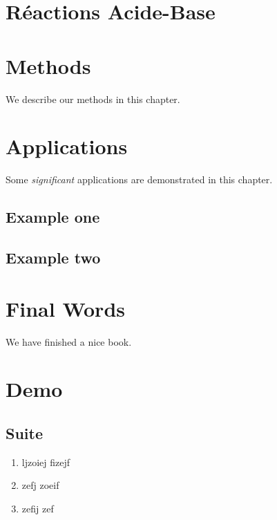 \documentclass[
]{book}
\providecommand{\tightlist}{%
  \setlength{\itemsep}{0pt}\setlength{\parskip}{0pt}}
\def\tightlist{}
\begin{document}
\hypertarget{ruxe9actions-acide-base}{%
\chapter{Réactions Acide-Base}\label{ruxe9actions-acide-base}}

\hypertarget{methods}{%
\chapter{Methods}\label{methods}}

We describe our methods in this chapter.

\hypertarget{applications}{%
\chapter{Applications}\label{applications}}

Some \emph{significant} applications are demonstrated in this chapter.

\hypertarget{example-one}{%
\section{Example one}\label{example-one}}

\hypertarget{example-two}{%
\section{Example two}\label{example-two}}

\hypertarget{final-words}{%
\chapter{Final Words}\label{final-words}}

We have finished a nice book.

\hypertarget{demo}{%
\chapter*{Demo}\label{demo}}

\hypertarget{suite}{%
\section{Suite}\label{suite}}

\begin{enumerate}
\def\labelenumi{\arabic{enumi}.}
\tightlist
\item
  ljzoiej fizejf
\item
  zefj zoeif
\item
  zefij zef
\end{enumerate}
\end{document}
